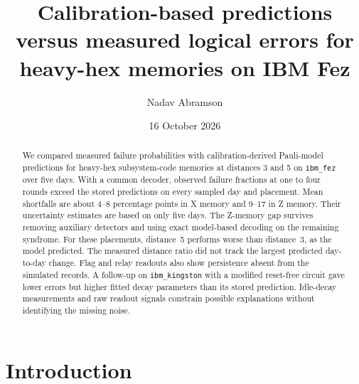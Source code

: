 \documentclass[aps,pra,reprint,nofootinbib,longbibliography,floatfix,showkeys]{revtex4-2}
\begin{document}
\title{Calibration-based predictions versus measured logical errors for heavy-hex memories on IBM Fez}

\author{Nadav Abramson}

\date{16 October 2026}

\begin{abstract}
We compared measured failure probabilities with calibration-derived Pauli-model predictions for heavy-hex subsystem-code memories at distances 3 and 5 on \texttt{ibm\_fez} over five days.
With a common decoder, observed failure fractions at one to four rounds exceed the stored predictions on every sampled day and placement.
Mean shortfalls are about 4--8 percentage points in X memory and 9--17 in Z memory. Their uncertainty estimates are based on only five days.
The Z-memory gap survives removing auxiliary detectors and using exact model-based decoding on the remaining syndrome.
For these placements, distance~5 performs worse than distance~3, as the model predicted. The measured distance ratio did not track the largest predicted day-to-day change.
Flag and relay readouts also show persistence absent from the simulated records.
A follow-up on \texttt{ibm\_kingston} with a modified reset-free circuit gave lower errors but higher fitted decay parameters than its stored prediction.
Idle-decay measurements and raw readout signals constrain possible explanations without identifying the missing noise.
\end{abstract}


\maketitle

\section{Introduction}
\label{sec:intro}
\end{document}
